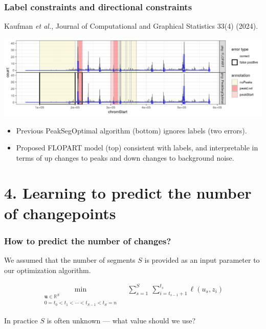 \documentclass{beamer}
\newcommand{\RR}{\mathbb R}
\begin{document}
\begin{frame}
  \frametitle{Label constraints and directional constraints}
   Kaufman \emph{et al.}, Journal of Computational and Graphical Statistics 33(4) (2024).

  \includegraphics[width=\linewidth]{FLOPART-example}

  \begin{itemize}
  \item Previous PeakSegOptimal algorithm (bottom) ignores labels (two
    errors).
  \item Proposed FLOPART model (top) consistent with labels, and
    interpretable in terms of up changes to peaks and down changes to
    background noise.
  \end{itemize}
\end{frame}

\section{4. Learning to predict the number of changepoints}
 
\begin{frame}
  \frametitle{How to predict the number of changes?}

  We assumed that the number of segments $S$ is provided as an input
  parameter to our optimization algorithm.

\begin{align*}
\min_{\substack{
  \mathbf u\in\RR^{S}
\\
   0=t_0<t_1<\cdots<t_{S-1}<t_S=n
}} & \ \
    \sum_{s=1}^S\  \sum_{i=t_{s-1}+1}^{t_s} \ell( u_s,  z_i) 
  \nonumber
\end{align*}

In practice $S$ is often unknown --- what value should we use?

\end{frame}
\end{document}
